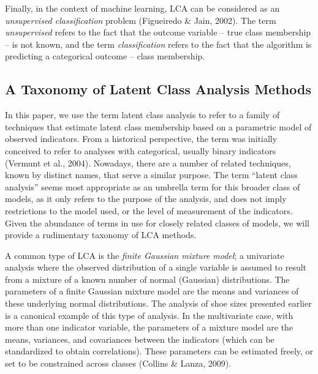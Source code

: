 \documentclass[
  ,man,floatsintext]{apa6}
\begin{document}
Finally, in the context of machine learning, LCA can be considered as an
\emph{unsupervised classification} problem (Figueiredo \& Jain, 2002).
The term \emph{unsupervised} refers to the fact that the outcome variable --
true class membership -- is not known, and the term \emph{classification}
refers to the fact that the algorithm is predicting a categorical
outcome -- class membership.

\hypertarget{a-taxonomy-of-latent-class-analysis-methods}{%
\subsection{A Taxonomy of Latent Class Analysis Methods}\label{a-taxonomy-of-latent-class-analysis-methods}}

In this paper, we use the term latent class analysis to refer to a
family of techniques that estimate latent class membership based on a
parametric model of observed indicators. From a historical perspective,
the term was initially conceived to refer to analyses with categorical,
usually binary indicators (Vermunt et al., 2004). Nowadays, there are
a number of related techniques, known by distinct names, that serve a
similar purpose. The term ``latent class analysis'' seems most appropriate
as an umbrella term for this broader class of models, as it only refers
to the purpose of the analysis, and does not imply restrictions to the
model used, or the level of measurement of the indicators. Given the
abundance of terms in use for closely related classes of models, we will
provide a rudimentary taxonomy of LCA methods.

A common type of LCA is the \emph{finite Gaussian mixture model}; a
univariate analysis where the observed distribution of a single variable
is assumed to result from a mixture of a known number of normal
(Gaussian) distributions. The parameters of a finite Gaussian mixture
model are the means and variances of these underlying normal
distributions. The analysis of shoe sizes presented earlier is a
canonical example of this type of analysis. In the multivariate case,
with more than one indicator variable, the parameters of a mixture model
are the means, variances, and covariances between the indicators (which
can be standardized to obtain correlations). These parameters can be
estimated freely, or set to be constrained across classes (Collins \& Lanza, 2009).
\end{document}
